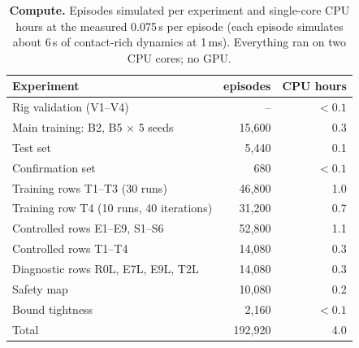 \begin{table}[!htbp]\centering\small
\caption{\textbf{Compute.} Episodes simulated per experiment and single-core CPU hours at the measured 0.075\,s per episode
(each episode simulates about 6\,s of contact-rich dynamics at 1\,ms). Everything ran on two CPU cores; no GPU.}\label{tab:compute}
\begin{tabular}{@{}lrr@{}}\toprule
Experiment & episodes & CPU hours\\\midrule
Rig validation (V1--V4) & -- & $<0.1$\\
Main training: B2, B5 $\times$ 5 seeds & 15{,}600 & 0.3\\
Test set & 5{,}440 & 0.1\\
Confirmation set & 680 & $<0.1$\\
Training rows T1--T3 (30 runs) & 46{,}800 & 1.0\\
Training row T4 (10 runs, 40 iterations) & 31{,}200 & 0.7\\
Controlled rows E1--E9, S1--S6 & 52{,}800 & 1.1\\
Controlled rows T1--T4 & 14{,}080 & 0.3\\
Diagnostic rows R0L, E7L, E9L, T2L & 14{,}080 & 0.3\\
Safety map & 10{,}080 & 0.2\\
Bound tightness & 2{,}160 & $<0.1$\\
\midrule Total & 192{,}920 & 4.0\\
\bottomrule\end{tabular}\end{table}